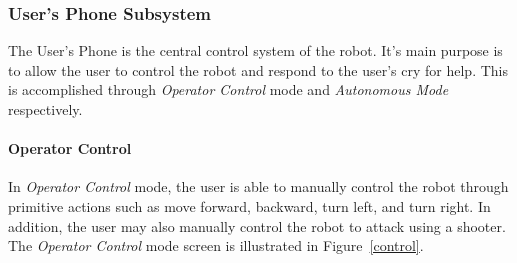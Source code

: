 \documentclass[12pt]{article}
\begin{document}
\subsubsection{User's Phone Subsystem}
The User's Phone is the central control system of the robot. It's main purpose is to allow the user to control the robot and respond to the user's cry for help. This is accomplished through \textit{Operator Control} mode and \textit{Autonomous Mode} respectively. 

\paragraph{Operator Control}

In \textit{Operator Control} mode, the user is able to manually control the robot through primitive actions such as move forward, backward, turn left, and turn right. In addition, the user may also manually control the robot to attack using a shooter. The \textit{Operator Control} mode screen is illustrated in Figure~\ref{control}.
\end{document}
